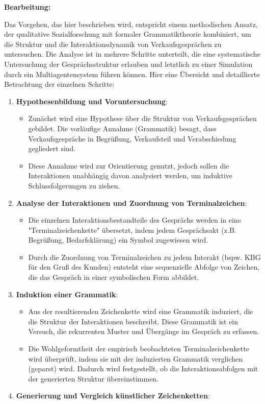 \documentclass[
]{article}
\begin{document}
\textbf{Bearbeitung:}

Das Vorgehen, das hier beschrieben wird, entspricht einem methodischen
Ansatz, der qualitative Sozialforschung mit formaler Grammatiktheorie
kombiniert, um die Struktur und die Interaktionsdynamik von
Verkaufsgesprächen zu untersuchen. Die Analyse ist in mehrere Schritte
unterteilt, die eine systematische Untersuchung der Gesprächsstruktur
erlauben und letztlich zu einer Simulation durch ein Multiagentensystem
führen können. Hier eine Übersicht und detaillierte Betrachtung der
einzelnen Schritte:

\begin{enumerate}
\def\labelenumi{\arabic{enumi}.}
\item
  \textbf{Hypothesenbildung und Voruntersuchung}:

  \begin{itemize}
  \item
    Zunächst wird eine Hypothese über die Struktur von
    Verkaufsgesprächen gebildet. Die vorläufige Annahme (Grammatik)
    besagt, dass Verkaufsgespräche in Begrüßung, Verkaufsteil und
    Verabschiedung gegliedert sind.
  \item
    Diese Annahme wird zur Orientierung genutzt, jedoch sollen die
    Interaktionen unabhängig davon analysiert werden, um induktive
    Schlussfolgerungen zu ziehen.
  \end{itemize}
\item
  \textbf{Analyse der Interaktionen und Zuordnung von Terminalzeichen}:

  \begin{itemize}
  \item
    Die einzelnen Interaktionsbestandteile des Gesprächs werden in eine
    "Terminalzeichenkette" übersetzt, indem jedem Gesprächsakt (z.B.
    Begrüßung, Bedarfsklärung) ein Symbol zugewiesen wird.
  \item
    Durch die Zuordnung von Terminalzeichen zu jedem Interakt (bspw. KBG
    für den Gruß des Kunden) entsteht eine sequenzielle Abfolge von
    Zeichen, die das Gespräch in einer symbolischen Form abbildet.
  \end{itemize}
\item
  \textbf{Induktion einer Grammatik}:

  \begin{itemize}
  \item
    Aus der resultierenden Zeichenkette wird eine Grammatik induziert,
    die die Struktur der Interaktionen beschreibt. Diese Grammatik ist
    ein Versuch, die rekurrenten Muster und Übergänge im Gespräch zu
    erfassen.
  \item
    Die Wohlgeformtheit der empirisch beobachteten Terminalzeichenkette
    wird überprüft, indem sie mit der induzierten Grammatik verglichen
    (geparst) wird. Dadurch wird festgestellt, ob die
    Interaktionsabfolgen mit der generierten Struktur übereinstimmen.
  \end{itemize}
\item
  \textbf{Generierung und Vergleich künstlicher Zeichenketten}:


\end{enumerate}
\end{document}
